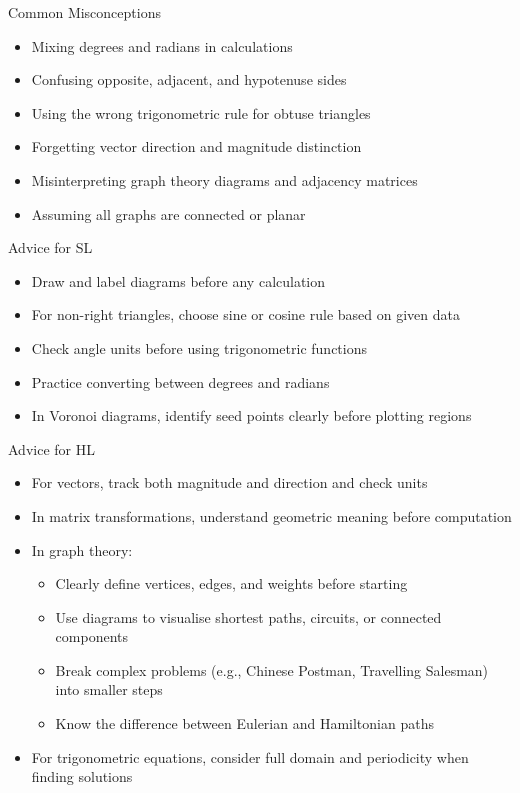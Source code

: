 \documentclass[11pt]{article}
\def\textbf#1{#1}%
\begin{document}
\textbf{Common Misconceptions}  
\begin{itemize}
  \item Mixing degrees and radians in calculations
  \item Confusing opposite, adjacent, and hypotenuse sides
  \item Using the wrong trigonometric rule for obtuse triangles
  \item Forgetting vector direction and magnitude distinction
  \item Misinterpreting graph theory diagrams and adjacency matrices
  \item Assuming all graphs are connected or planar
\end{itemize}

\textbf{Advice for SL}  
\begin{itemize}
  \item Draw and label diagrams before any calculation
  \item For non-right triangles, choose sine or cosine rule based on given data
  \item Check angle units before using trigonometric functions
  \item Practice converting between degrees and radians
  \item In Voronoi diagrams, identify seed points clearly before plotting regions
\end{itemize}

\textbf{Advice for HL}  
\begin{itemize}
  \item For vectors, track both magnitude and direction and check units
  \item In matrix transformations, understand geometric meaning before computation
  \item In graph theory:
    \begin{itemize}
      \item Clearly define vertices, edges, and weights before starting
      \item Use diagrams to visualise shortest paths, circuits, or connected components
      \item Break complex problems (e.g., Chinese Postman, Travelling Salesman) into smaller steps
      \item Know the difference between Eulerian and Hamiltonian paths
    \end{itemize}
  \item For trigonometric equations, consider full domain and periodicity when finding solutions
\end{itemize}
\end{document}
